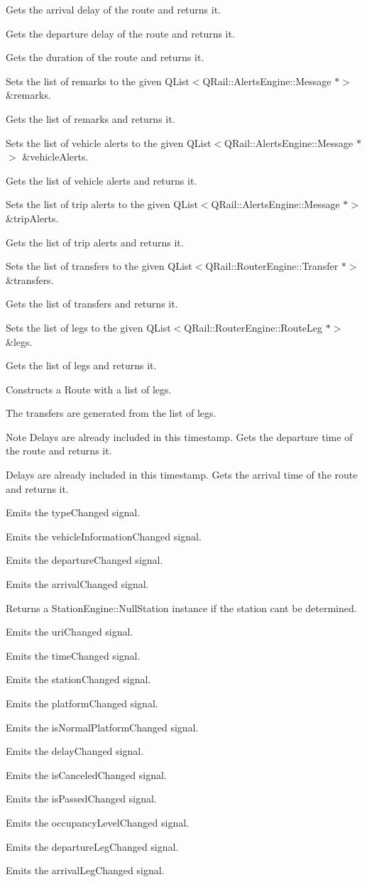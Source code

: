 Gets the arrival delay of the route and returns it.

Gets the departure delay of the route and returns it.

Gets the duration of the route and returns it.

Sets the list of remarks to the given Q\+List$<$\+Q\+Rail\+::\+Alerts\+Engine\+::\+Message $\ast$$>$ \&remarks.

Gets the list of remarks and returns it.

Sets the list of vehicle alerts to the given Q\+List$<$\+Q\+Rail\+::\+Alerts\+Engine\+::\+Message $\ast$$>$ \&vehicle\+Alerts.

Gets the list of vehicle alerts and returns it.

Sets the list of trip alerts to the given Q\+List$<$\+Q\+Rail\+::\+Alerts\+Engine\+::\+Message $\ast$$>$ \&trip\+Alerts.

Gets the list of trip alerts and returns it.

Sets the list of transfers to the given Q\+List$<$\+Q\+Rail\+::\+Router\+Engine\+::\+Transfer $\ast$$>$ \&transfers.

Gets the list of transfers and returns it.

Sets the list of legs to the given Q\+List$<$\+Q\+Rail\+::\+Router\+Engine\+::\+Route\+Leg $\ast$$>$ \&legs.

Gets the list of legs and returns it.

Constructs a Route with a list of legs.

The transfers are generated from the list of legs.

\begin{DoxyNote}{Note}
Delays are already included in this timestamp. Gets the departure time of the route and returns it.

Delays are already included in this timestamp. Gets the arrival time of the route and returns it.
\end{DoxyNote}
Emits the type\+Changed signal.

Emits the vehicle\+Information\+Changed signal.

Emits the departure\+Changed signal.

Emits the arrival\+Changed signal.

Returns a Station\+Engine\+::\+Null\+Station instance if the station can\textquotesingle{}t be determined.

Emits the uri\+Changed signal.

Emits the time\+Changed signal.

Emits the station\+Changed signal.

Emits the platform\+Changed signal.

Emits the is\+Normal\+Platform\+Changed signal.

Emits the delay\+Changed signal.

Emits the is\+Canceled\+Changed signal.

Emits the is\+Passed\+Changed signal.

Emits the occupancy\+Level\+Changed signal.

Emits the departure\+Leg\+Changed signal.

Emits the arrival\+Leg\+Changed signal. 